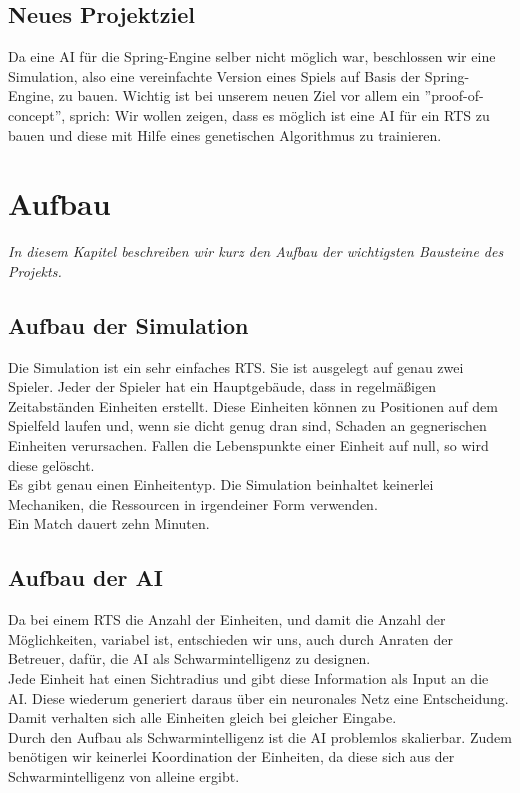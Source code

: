 \documentclass[
	12pt,
	a4paper,
	BCOR10mm,
	DIV14,
	headsepline,
	usegeometry,
]{scrreprt}
\begin{document}
\section{Neues Projektziel}
Da eine AI für die Spring-Engine selber nicht möglich war, beschlossen wir eine Simulation, also eine vereinfachte Version eines Spiels auf Basis der Spring-Engine, zu bauen. Wichtig ist bei unserem neuen Ziel vor allem ein ''proof-of-concept'', sprich: Wir wollen zeigen, dass es möglich ist eine AI für ein RTS zu bauen und diese mit Hilfe eines genetischen Algorithmus zu trainieren.


\chapter{Aufbau}
\label{Aufbau}

\textit{%
In diesem Kapitel beschreiben wir kurz den Aufbau der wichtigsten Bausteine des Projekts.
}

\bigskip

\section{Aufbau der Simulation}
Die Simulation ist ein sehr einfaches RTS. Sie ist ausgelegt auf genau zwei Spieler. Jeder der Spieler hat ein Hauptgebäude, dass in regelmäßigen Zeitabständen Einheiten erstellt. Diese Einheiten können zu Positionen auf dem Spielfeld laufen und, wenn sie dicht genug dran sind, Schaden an gegnerischen Einheiten verursachen. Fallen die Lebenspunkte einer Einheit auf null, so wird diese gelöscht.\\
Es gibt genau einen Einheitentyp. Die Simulation beinhaltet keinerlei Mechaniken, die Ressourcen in irgendeiner Form verwenden.\\
Ein Match dauert zehn Minuten.

\section{Aufbau der AI}
Da bei einem RTS die Anzahl der Einheiten, und damit die Anzahl der Möglichkeiten, variabel ist, entschieden wir uns, auch durch Anraten der Betreuer, dafür, die AI als Schwarmintelligenz zu designen.\\
Jede Einheit hat einen Sichtradius und gibt diese Information als Input an die AI. Diese wiederum generiert daraus über ein neuronales Netz eine Entscheidung. Damit verhalten sich alle Einheiten gleich bei gleicher Eingabe. \\
Durch den Aufbau als Schwarmintelligenz ist die AI problemlos skalierbar. Zudem benötigen wir keinerlei Koordination der Einheiten, da diese sich aus der Schwarmintelligenz von alleine ergibt.
\end{document}
